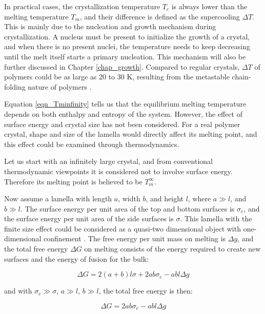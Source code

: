 In practical cases, the crystallization temperature $T_{c}$ is always lower than the melting temperature $T_{m}$, and their difference is defined as the supercooling $\Delta T$. This is mainly due to the nucleation and growth mechanism during crystallization. A nucleus must be present to initialize the growth of a crystal, and when there is no present nuclei, the temperature needs to keep decreasing until the melt itself starts a primary nucleation. This mechanism will also be further discussed in Chapter \ref{chap_growth}. Compared to regular crystals, $\Delta T$ of polymers could be as large as 20 to 30 K, resulting from the metastable chain-folding nature of polymers \cite{Hu2013}.

Equation \ref{eqn_Tminfinity} tells us that the equilibrium melting temperature depends on both enthalpy and entropy of the system. However, the effect of surface energy and crystal size has not been considered. For a real polymer crystal, shape and size of the lamella would directly affect its melting point, and this effect could be examined through thermodynamics.

Let us start with an infinitely large crystal, and from conventional thermodynamic viewpoints it is considered not to involve surface energy. Therefore its melting point is believed to be $T_{m}^{\infty}$.

Now assume a lamella with length $a$, width $b$, and height $l$, where $a \gg l$, and $b \gg l$. The surface energy per unit area of the top and bottom surfaces is $\sigma_{e}$, and the surface energy per unit area of the side surfaces is $\sigma$. This lamella with the finite size effect could be considered as a quasi-two dimensional object with one-dimensional confinement \cite{Zhang2016}. The free energy per unit mass on melting is $\Delta g$, and the total free energy $\Delta G$ on melting consists of the energy required to create new surfaces and the energy of fusion for the bulk:

\begin{equation}
\label{eqn_delta G lamella}
\Delta G = 2(a+b)l\sigma + 2ab\sigma_{e} - abl\Delta g
\end{equation}

\noindent
and with $\sigma_{e}\gg\sigma$, $a\gg l$, $b\gg l$, the total free energy is then:

\begin{equation}
\label{eqn_delta G lamella reduced}
\Delta G = 2ab\sigma_{e} - abl\Delta g
\end{equation}

